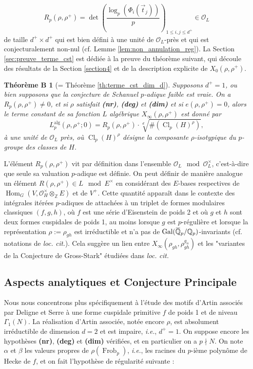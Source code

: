 \documentclass[12pt]{amsart}
\newcommand\bZ{\mathbb{Z}}
\newcommand\bQ{\mathbb{Q}}
\newcommand\Qp{\mathbb{Q}_{p}}
\newcommand\cO{\mathcal{O}}
\newcommand{\ob}[1]{\mkern 1.5mu\overline{\mkern-1.5mu#1\mkern-1.5mu}\mkern 1.5mu}
\newcommand{\alg}{\textrm{alg}}
\DeclareMathOperator{\Gal}{Gal}
\DeclareMathOperator{\Hom}{Hom}
\DeclareMathOperator{\Cl}{Cl}
\DeclareMathOperator{\Frob}{Frob}
\theoremstyle{defstyle}
\theoremstyle{thmstyle}
\newtheorem*{thB}{Théorème B}
\begin{document}
$$R_p(\rho,\rho^+)=\det\left(\frac{\log_p\left(\Phi_i(\vec{t}_j)\right)}{p}\right)_{1\leq i,j\leq d^+} \in \cO_L$$
de taille $d^+\times d^+$ qui est bien défini à une unité de $\cO_L$-près et qui est conjecturalement non-nul (cf. Lemme \ref{lem:non_annulation_reg}). La Section \ref{sec:preuve_terme_cst} est dédiée à la preuve du théorème suivant, qui découle des résultats de la Section \ref{section4} et de la description explicite de $X_0(\rho,\rho^+)$.

\begin{thB}[= Théorème \ref{th:terme_cst_dim_d}]
	Supposons $d^+=1$, ou bien supposons que la conjecture de Schanuel $p$-adique faible est vraie. On a $R_p(\rho,\rho^+)\neq 0$, et si $\rho$ satisfait \textbf{(nr)}, \textbf{(deg)} et \textbf{(dim)} et si $e(\rho,\rho^+)=0$, alors le terme constant de sa fonction $L$ algébrique $X_\infty(\rho,\rho^+)$ est donné par 
	$$L_p^{\alg}(\rho,\rho^+;0) = R_p(\rho,\rho^+) \cdot \sqrt[d]{\#\left(\Cl_p(H)^\rho\right)},$$
	à une unité de $\cO_L$ près, où $\Cl_p(H)^\rho$ désigne la composante $\rho$-isotypique du $p$-groupe des classes de $H$.
\end{thB}

L'élément $R_p(\rho,\rho^+)$ vit par définition dans l'ensemble $\cO_L \mod \cO_L^\times$, c'est-à-dire que seule sa valuation $p$-adique est définie. On peut définir de manière analogue un élément $R(\rho,\rho^+) \in L \mod E^\times$ en considérant des $E$-bases respectives de $\Hom_G(V,\cO_H^\times \otimes_\bZ E)$ et de $V^+$. Cette quantité apparaît dans le contexte des intégrales itérées $p$-adiques de \cite{DLR2} attachées à un triplet de formes modulaires classiques $(f,g,h)$, où $f$ est une série d'Eisenstein de poids 2 et où $g$ et $h$ sont deux formes cuspidales de poids 1, au moins lorsque $g$ est $p$-régulière et lorsque la représentation $\rho := \rho_{gh}$ est irréductible et n'a pas de $\Gal(\ob{\bQ}_p/\Qp)$-invariants (cf. notations de \textit{loc. cit.}). Cela suggère un lien entre $X_\infty(\rho_{gh},\rho_{gh}^{g_\alpha})$ et les "variantes de la Conjecture de Gross-Stark" étudiées dans \textit{loc. cit.} 

\subsection*{Aspects analytiques et Conjecture Principale}

Nous nous concentrons plus spécifiquement à l'étude des motifs d'Artin associés par Deligne et Serre à une forme cuspidale primitive $f$ de poids 1 et de niveau $\Gamma_1(N)$. La réalisation d'Artin associée, notée encore $\rho$, est absolument irréductible de dimension $d=2$ et est impaire, \textit{i.e.}, $d^+=1$. On suppose encore les hypothèses \textbf{(nr)}, \textbf{(deg)} et \textbf{(dim)} vérifiées, et en particulier on a $p\nmid N$. On note $\alpha$ et $\beta$ les valeurs propres de $\rho(\Frob_p)$, \textit{i.e.}, les racines du $p$-ième polynôme de Hecke de $f$, et on fait l'hypothèse de régularité suivante : 
\end{document}
